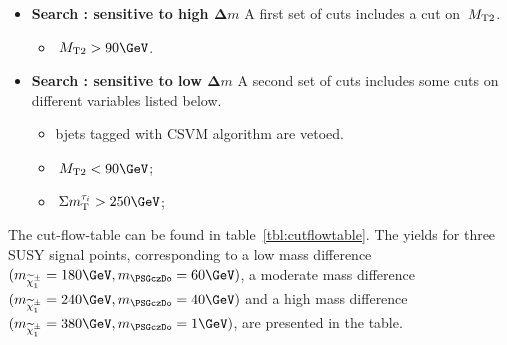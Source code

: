 \begin{itemize}
\item \textbf{Search \binone: sensitive to high $\boldsymbol\Delta m$}
A first set of cuts includes a cut on $\,{M_{\rm T2}}$.
\begin{itemize}
\item $\mttwo>90\GeV$.
\end{itemize}
\item \textbf{Search \bintwo: sensitive to low $\boldsymbol\Delta m$}
A second set of cuts includes some cuts on different variables listed below.
\begin{itemize}
\item bjets tagged with CSVM algorithm are vetoed.
\item $\mttwo<90\GeV$;
\item $\SumMT>250\GeV$;
\end{itemize}
\end{itemize}
The cut-flow-table can be found in table~\ref{tbl:cutflowtable}. The yields for three SUSY signal points, corresponding to a low mass difference $(m_{\chione}=180\GeV,m_{\PSGczDo}=60\GeV)$, a moderate mass difference $(m_{\chione}=240\GeV,m_{\PSGczDo}=40\GeV)$ and a high mass difference $(m_{\chione}=380\GeV,m_{\PSGczDo}=1\GeV)$, are presented in the table.   
